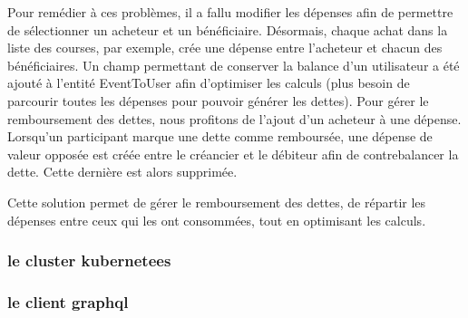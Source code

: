 Pour remédier à ces problèmes, il a fallu modifier les dépenses afin de permettre de sélectionner un acheteur et un bénéficiaire.
Désormais, chaque achat dans la liste des courses, par exemple, crée une dépense entre l'acheteur et chacun des bénéficiaires.
Un champ permettant de conserver la balance d'un utilisateur a été ajouté à l'entité EventToUser afin d'optimiser les calculs (plus besoin de parcourir toutes les dépenses pour pouvoir générer les dettes).
Pour gérer le remboursement des dettes, nous profitons de l'ajout d'un acheteur à une dépense.
Lorsqu'un participant marque une dette comme remboursée, une dépense de valeur opposée est créée entre le créancier et le débiteur afin de contrebalancer la dette.
Cette dernière est alors supprimée.

Cette solution permet de gérer le remboursement des dettes, de répartir les dépenses entre ceux qui les ont consommées, tout en optimisant les calculs.

\subsubsection{le cluster kubernetees}

\subsubsection{le client graphql}
